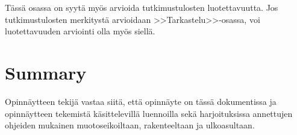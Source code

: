 \documentclass[english,12pt,a4paper,pdftex,elec,utf8]{aaltothesis}
\begin{document}
T\"ass\"a osassa on syyt\"a my\"os arvioida tutkimustulosten luotettavuutta.
Jos tutkimustulosten merkityst\"a arvioidaan >>Tarkastelu>>-osassa,
voi luotettavuuden arviointi olla my\"os siell\"a. 

\clearpage

\section{Summary} 

Opinn\"aytteen tekij\"a vastaa siit\"a, ett\"a opinn\"ayte on t\"ass\"a dokumentissa
ja opinn\"aytteen tekemist\"a k\"asittelevill\"a luennoilla sek\"a
harjoituksissa annettujen ohjeiden mukainen muotoseikoiltaan,
rakenteeltaan ja ulkoasultaan.



\clearpage
\end{document}
